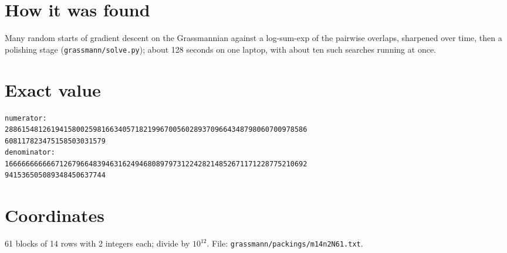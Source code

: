 \documentclass[11pt,a4paper]{article}
\begin{document}
\section{How it was found}
Many random starts of gradient descent on the Grassmannian against a log-sum-exp of the pairwise overlaps, sharpened over time, then a polishing stage (\texttt{grassmann/solve.py}); about 128 seconds on one laptop, with about ten such searches running at once.


\appendix
\section{Exact value}
{\small
\begin{verbatim}
numerator:
288615481261941580025981663405718219967005602893709664348798060700978586
608117823475158503031579
denominator:
166666666666712679664839463162494680897973122428214852671171228775210692
941536505089348450637744
\end{verbatim}}

\section{Coordinates}
61 blocks of 14 rows with 2 integers each; divide by $10^{12}$. File: \texttt{grassmann/packings/m14n2N61.txt}.
{\tiny
\begin{multicols}{4}
\end{multicols}}
\end{document}
